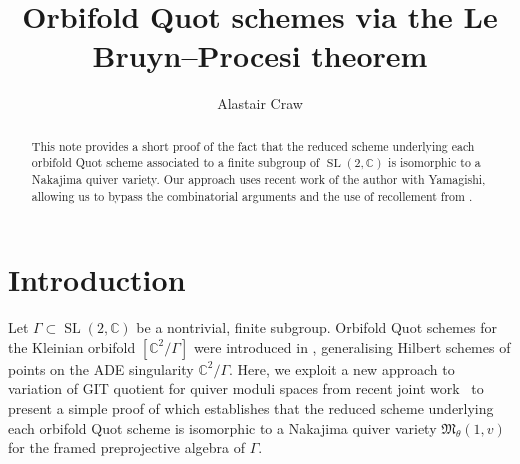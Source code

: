 \documentclass[11pt,reqno]{amsart}
\title{Orbifold Quot schemes via  the Le Bruyn--Procesi theorem}
\author{Alastair Craw}
\numberwithin{equation}{section}
\theoremstyle{definition}
\newcommand{\CC}{\ensuremath{\mathbb{C}}}
\newcommand{\SL}{\operatorname{SL}}
\begin{document}
 
 \begin{abstract}
 This note provides a short proof of the fact that the reduced scheme underlying each orbifold Quot scheme associated to a finite subgroup of $\SL(2,\mathbb{C})$ is isomorphic to a Nakajima quiver variety. Our approach uses recent work of the author with Yamagishi, allowing us to bypass the combinatorial arguments and the use of recollement from \cite{CGGS2}. 
 \end{abstract}

 \maketitle

  \section{Introduction}
 Let $\Gamma\subset \SL(2,\CC)$ be a nontrivial, finite subgroup. Orbifold Quot schemes for the Kleinian orbifold $[\mathbb{C}^2/\Gamma]$ were introduced in \cite{CGGS2}, generalising Hilbert schemes of points on the ADE singularity $\CC^2/\Gamma$. Here, we exploit a new approach to variation of GIT quotient for quiver moduli spaces from recent joint work~\cite{CY23} to present a simple proof of \cite[Theorem~1.1(3)]{CGGS2} which establishes that the reduced scheme underlying each orbifold Quot scheme is isomorphic to a Nakajima quiver variety $\mathfrak{M}_{\theta}(1,v)$ for the framed preprojective algebra of $\Gamma$. 
 
\end{document}
